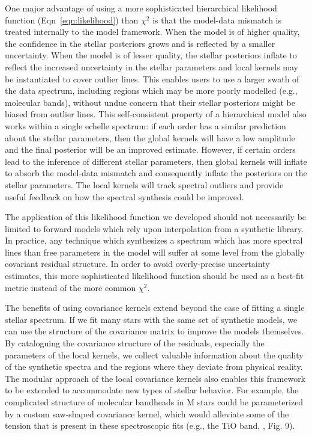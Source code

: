 \documentclass[iop,floatfix]{emulateapj}
\begin{document}
One major advantage of using a more sophisticated hierarchical likelihood function (Eqn~\ref{eqn:likelihood}) than $\chi^2$ is that the model-data mismatch is treated internally to the model framework. When the model is of higher quality, the confidence in the stellar posteriors grows and is reflected by a smaller uncertainty. When the model is of lesser quality, the stellar posteriors inflate to reflect the increased uncertainty in the stellar parameters and local kernels may be instantiated to cover outlier lines. This enables users to use a larger swath of the data spectrum, including regions which may be more poorly modelled (e.g., molecular bands), without undue concern that their stellar posteriors might be biased from outlier lines. This self-consistent property of a hierarchical model also works within a single echelle spectrum: if each order has a similar prediction about the stellar parameters, then the global kernels will have a low amplitude and the final posterior will be an improved estimate. However, if certain orders lead to the inference of different stellar parameters, then global kernels will inflate to absorb the model-data mismatch and consequently inflate the posteriors on the stellar parameters. The local kernels will track spectral outliers and provide useful feedback on how the spectral synthesis could be improved.

The application of this likelihood function we developed should not necessarily be limited to forward models which rely upon interpolation from a synthetic library. In practice, any technique which synthesizes a spectrum which has more spectral lines than free parameters in the model will suffer at some level from the globally covariant residual structure. In order to avoid overly-precise uncertainty estimates, this more sophisticated likelihood function should be used as a best-fit metric instead of the more common $\chi^2$.

The benefits of using covariance kernels extend beyond the case of fitting a single stellar spectrum. If we fit many stars with the same set of synthetic models, we can use the structure of the covariance matrix to improve the models themselves. By cataloguing the covariance structure of the residuals, especially the parameters of the local kernels, we collect valuable information about the quality of the synthetic spectra and the regions where they deviate from physical reality. The modular approach of the local covariance kernels also enables this framework to be extended to accommodate new types of stellar behavior. For example, the complicated structure of molecular bandheads in M stars could be parameterized by a custom saw-shaped covariance kernel, which would alleviate some of the tension that is present in these spectroscopic fits (e.g., the TiO band, \citealt{mann13}, Fig. 9).
\end{document}
